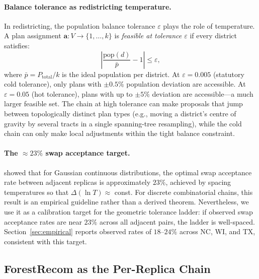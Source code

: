\paragraph{Balance tolerance as redistricting temperature.}
In redistricting, the population balance tolerance $\varepsilon$ plays the role
of temperature.
A plan assignment $\mathbf{a}: V \to \{1,\ldots,k\}$ is \emph{feasible at
tolerance $\varepsilon$} if every district satisfies:
\[
  \left|\frac{\text{pop}(d)}{\bar{p}} - 1\right| \le \varepsilon,
\]
where $\bar{p} = P_{\mathrm{total}}/k$ is the ideal population per district.
At $\varepsilon = 0.005$ (statutory cold tolerance), only plans with $\pm 0.5\%$
population deviation are accessible.
At $\varepsilon = 0.05$ (hot tolerance), plans with up to $\pm 5\%$ deviation
are accessible---a much larger feasible set.
The \fr{} chain at high tolerance can make proposals that jump between
topologically distinct plan types (e.g., moving a district's centre of gravity
by several tracts in a single spanning-tree resampling), while the cold chain
can only make local adjustments within the tight balance constraint.

\paragraph{The ${\approx}23\%$ swap acceptance target.}
\citet{kone2005} showed that for Gaussian continuous distributions, the
optimal swap acceptance rate between adjacent replicas is approximately $23\%$,
achieved by spacing temperatures so that $\Delta(\ln T) \approx$ const.
For discrete combinatorial chains, this result is an empirical guideline rather
than a derived theorem.
Nevertheless, we use it as a calibration target for the geometric tolerance
ladder: if observed swap acceptance rates are near $23\%$ across all adjacent
pairs, the ladder is well-spaced.
Section~\ref{sec:empirical} reports observed rates of $18$--$24\%$ across NC,
WI, and TX, consistent with this target.

\subsection{ForestRecom as the Per-Replica Chain}

